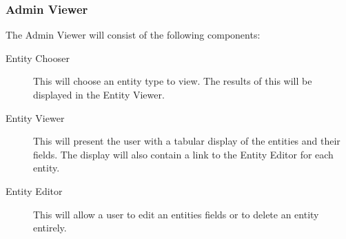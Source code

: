 \subsubsection{Admin Viewer}

The Admin Viewer will consist of the following components:

\begin{description}
\item[Entity Chooser] This will choose an entity type to view. The results of this will be displayed in the Entity Viewer.
\item[Entity Viewer] This will present the user with a tabular display of the entities and their fields. The display will also contain a link to the Entity Editor for each entity.
\item[Entity Editor] This will allow a user to edit an entities fields or to delete an entity entirely.
\end{description} 

